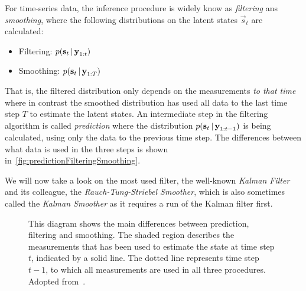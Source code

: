 	For time-series data, the inference procedure is widely know as \emph{filtering} ans \emph{smoothing}, where the following distributions on the latent states \( \vec{s}_t \) are calculated:
	\begin{itemize}
		\item Filtering: \tabto{2.5cm} \( p(\boldsymbol{\mathrm{s}}_t \,\vert\, \boldsymbol{\mathrm{y}}_{1:t}) \)
		\item Smoothing: \tabto{2.5cm} \( p(\boldsymbol{\mathrm{s}}_t \,\vert\, \boldsymbol{\mathrm{y}}_{1:T}) \)
	\end{itemize}
	That is, the filtered distribution only depends on the measurements \emph{to that time} where in contrast the smoothed distribution has used all data to the last time step \(T\) to estimate the latent states. An intermediate step in the filtering algorithm is called \emph{prediction} where the distribution \( p(\boldsymbol{\mathrm{s}}_t \,\vert\, \boldsymbol{\mathrm{y}}_{1:t - 1}) \) is being calculated, using only the data to the previous time step. The differences between what data is used in the three steps is shown in~\autoref{fig:predictionFilteringSmoothing}.

	We will now take a look on the most used filter, the well-known \emph{Kalman Filter} and its colleague, the \emph{Rauch-Tung-Striebel Smoother}, which is also sometimes called the \emph{Kalman Smoother} as it requires a run of the Kalman filter first.

	\begin{figure}
		\centering
		\tikzPredictionFilteringSmoothing
		\caption{This diagram shows the main differences between prediction, filtering and smoothing. The shaded region describes the measurements that has been used to estimate the state at time step \(t\), indicated by a solid line. The dotted line represents time step \(t - 1\), to which all measurements are used in all three procedures. \\ Adopted from~\cite{solinCubatureIntegrationMethods2010}.}
		\label{fig:predictionFilteringSmoothing}
	\end{figure}

